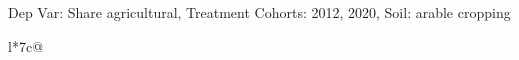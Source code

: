 \begin{table}[H]
\captionlistentry[table]{}
\label{table:beaver_land_class_DVis_land_class_1_SCg13_SSAC}
\scriptsize %
Dep Var: Share agricultural, Treatment Cohorts: 2012, 2020, Soil: arable cropping \\
\begin{threeparttable}
\begin{tabulary}{\textwidth}{l*{7}{c}@{}}
\toprule \toprule
\noalign{\smallskip}
\noalign{\smallskip}
\midrule \bottomrule
\end{tabulary}
\medskip
\end{threeparttable}
\end{table}
